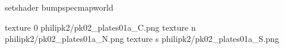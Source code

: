 setshader bumpspecmapworld

texture 0 philipk2/pk02_plates01a_C.png
texture n philipk2/pk02_plates01a_N.png
texture s philipk2/pk02_plates01a_S.png

